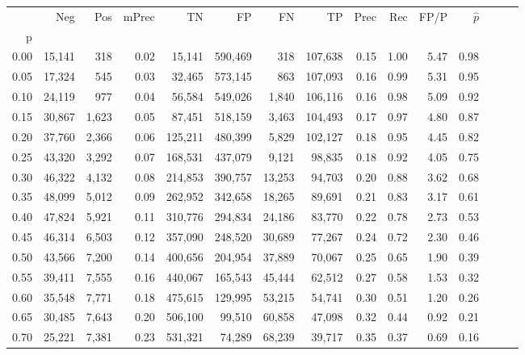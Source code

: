 \begin{tabular}{rrrrrrrrrrrrrrr}
\toprule
{} &     Neg &    Pos & mPrec &       TN &       FP &       FN &       TP &  Prec &   Rec &  FP/P & $\hat{p}$ \\
p    &         &        &       &          &          &          &          &       &       &       &           \\
\midrule
0.00 &  15,141 &    318 &  0.02 &   15,141 &  590,469 &      318 &  107,638 &  0.15 &  1.00 &  5.47 &      0.98 \\
0.05 &  17,324 &    545 &  0.03 &   32,465 &  573,145 &      863 &  107,093 &  0.16 &  0.99 &  5.31 &      0.95 \\
0.10 &  24,119 &    977 &  0.04 &   56,584 &  549,026 &    1,840 &  106,116 &  0.16 &  0.98 &  5.09 &      0.92 \\
0.15 &  30,867 &  1,623 &  0.05 &   87,451 &  518,159 &    3,463 &  104,493 &  0.17 &  0.97 &  4.80 &      0.87 \\
0.20 &  37,760 &  2,366 &  0.06 &  125,211 &  480,399 &    5,829 &  102,127 &  0.18 &  0.95 &  4.45 &      0.82 \\
0.25 &  43,320 &  3,292 &  0.07 &  168,531 &  437,079 &    9,121 &   98,835 &  0.18 &  0.92 &  4.05 &      0.75 \\
0.30 &  46,322 &  4,132 &  0.08 &  214,853 &  390,757 &   13,253 &   94,703 &  0.20 &  0.88 &  3.62 &      0.68 \\
0.35 &  48,099 &  5,012 &  0.09 &  262,952 &  342,658 &   18,265 &   89,691 &  0.21 &  0.83 &  3.17 &      0.61 \\
0.40 &  47,824 &  5,921 &  0.11 &  310,776 &  294,834 &   24,186 &   83,770 &  0.22 &  0.78 &  2.73 &      0.53 \\
0.45 &  46,314 &  6,503 &  0.12 &  357,090 &  248,520 &   30,689 &   77,267 &  0.24 &  0.72 &  2.30 &      0.46 \\
0.50 &  43,566 &  7,200 &  0.14 &  400,656 &  204,954 &   37,889 &   70,067 &  0.25 &  0.65 &  1.90 &      0.39 \\
0.55 &  39,411 &  7,555 &  0.16 &  440,067 &  165,543 &   45,444 &   62,512 &  0.27 &  0.58 &  1.53 &      0.32 \\
0.60 &  35,548 &  7,771 &  0.18 &  475,615 &  129,995 &   53,215 &   54,741 &  0.30 &  0.51 &  1.20 &      0.26 \\
0.65 &  30,485 &  7,643 &  0.20 &  506,100 &   99,510 &   60,858 &   47,098 &  0.32 &  0.44 &  0.92 &      0.21 \\
0.70 &  25,221 &  7,381 &  0.23 &  531,321 &   74,289 &   68,239 &   39,717 &  0.35 &  0.37 &  0.69 &      0.16 \\

\end{tabular}
